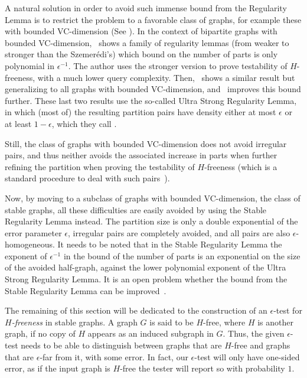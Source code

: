     A natural solution in order to avoid such immense bound from the Regularity Lemma is to restrict the problem
    to a favorable class of graphs, for example these with bounded VC-dimension (See ).
    In the context of bipartite graphs with bounded VC-dimension,~\cite{efficient_testing_of_bipartite_graphs_for_forbidden_induced_subgraphs}
    shows a family of regularity lemmas (from weaker to stronger than the Szemer\'edi's) which bound on the number of parts
    is only polynomial in $\epsilon^{-1}$.
    The author uses the stronger version to prove testability of $H$-freeness, with a much lower query complexity.
    Then,~\cite{??} shows a similar result but generalizing to all graphs with bounded VC-dimension,
    and~\cite{erdos_hajnal_conjecture_for_graphs_with_bounded_vc_dimension} improves this bound further.
    These last two results use the so-called Ultra Strong Regularity Lemma, in which (most of) the resulting partition
    pairs have density either at most $\epsilon$ or at least $1 -\epsilon$, which they call .

    Still, the class of graphs with bounded VC-dimension does not avoid irregular pairs, and thus neither avoids
    the associated increase in parts when further refining the partition when proving the testability of $H$-freeness
    (which is a standard procedure to deal with such pairs~\cite{efficient_testing_of_large_graphs}).

    Now, by moving to a subclass of graphs with bounded VC-dimension, the class of stable graphs,
    all these difficulties are easily avoided by using the Stable Regularity Lemma instead.
    The partition size is only a double exponential of the error parameter $\epsilon$, irregular pairs are
    completely avoided, and all pairs are also $\epsilon$-homogeneous.
    It needs to be noted that in the Stable Regularity Lemma the exponent of $\epsilon^{-1}$ in the bound of the number
    of parts is an exponential on the size of the avoided half-graph, against the lower polynomial exponent of the
    Ultra Strong Regularity Lemma.
    It is an open problem whether the bound from the Stable Regularity Lemma can be improved~\cite{julia_cositas}.

    The remaining of this section will be dedicated to the construction of an $\epsilon$-test for \emph{$H$-freeness} in stable graphs.
    A graph $G$ is said to be $H$-free, where $H$ is another graph, if no copy of $H$ appears as an induced subgraph in $G$.
    Thus, the given $\epsilon$-test needs to be able to distinguish between graphs that are $H$-free and graphs that
    are $\epsilon$-far from it, with some error.
    In fact, our $\epsilon$-test will only have one-sided error, as if the input graph is $H$-free the tester will
    report so with probability $1$.

